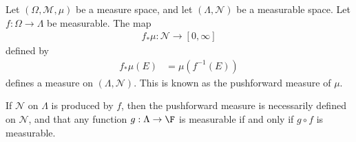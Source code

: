%
\begin{definition}
  Let $\left(\Omega,\mathcal{M},\mu\right)$ be a measure space, and let $\left(\Lambda,\mathcal{N}\right)$ be a measurable space. Let $f: \Omega\rightarrow \Lambda$ be measurable. The map
  \begin{align*}
    f_{\ast}\mu: \mathcal{N}\rightarrow [0,\infty]
  \end{align*}
  defined by
  \begin{align*}
    f_{\ast}\mu\left(E\right) &= \mu\left(f^{-1}\left(E\right)\right)
  \end{align*}
  defines a measure on $\left(\Lambda,\mathcal{N}\right)$. This is known as the pushforward measure of $\mu$.\newline

  If $\mathcal{N}$ on $\Lambda$ is produced by $f$, then the pushforward measure is necessarily defined on $\mathcal{N}$, and that any function $g: \Lambda\rightarrow \F$ is measurable if and only if $g\circ f$ is measurable.
\end{definition}
